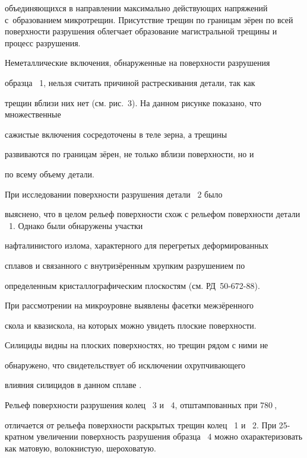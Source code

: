объединяющихся в направлении максимально действующих напряжений с~образованием микротрещин. Присутствие трещин по границам зёрен по всей поверхности разрушения облегчает образование магистральной трещины и процесс разрушения.



Неметаллические включения, обнаруженные на поверхности разрушения

образца \No~1, нельзя считать причиной растрескивания детали, так как

трещин вблизи них нет (см. рис.~3). На данном рисунке показано, что множественные

сажистые включения сосредоточены в теле зерна, а трещины

развиваются по границам зёрен, не только вблизи поверхности, но и

по всему объему детали.







При исследовании поверхности разрушения детали \No~2 было

выяснено, что в целом рельеф поверхности схож с рельефом поверхности детали \No~1. Однако были обнаружены участки

нафталинистого излома, характерного для перегретых деформированных

сплавов и связанного с внутризёренным хрупким разрушением по

определенным кристаллографическим плоскостям (см. РД~50-672-88).



При рассмотрении на микроуровне выявлены фасетки межзёренного

скола и квазискола, на которых можно увидеть плоские поверхности.

Силициды видны на плоских поверхностях, но трещин рядом с ними не

обнаружено, что свидетельствует об исключении охрупчивающего

влияния силицидов в данном сплаве \cite{pugacheva:bib2}.



Рельеф поверхности разрушения колец \No~3 и \No~4, отштампованных при $780~$\textcelsius,

отличается от рельефа поверхности раскрытых трещин колец \No~1 и \No~2. При 25-кратном увеличении  поверхность разрушения образца \No~4 можно охарактеризовать как матовую, волокнистую, шероховатую.



